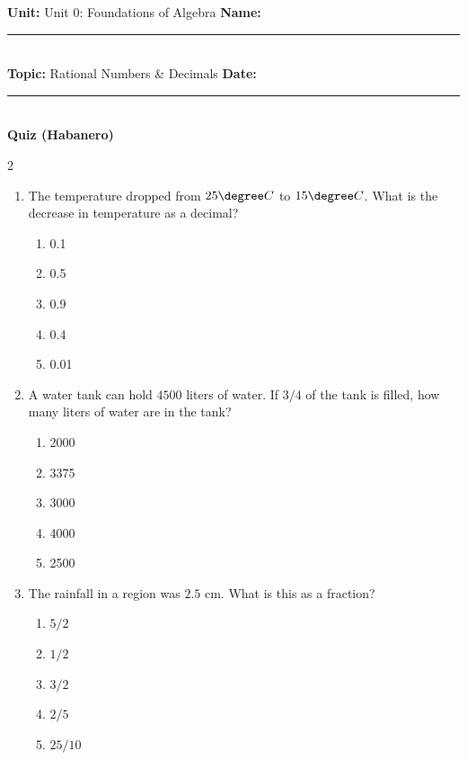 \documentclass[10pt]{article}
\begin{document}
\enlargethispage{2.5cm}

\begin{tcolorbox}[colback=mainblue!5, colframe=mainblue, sharp corners, boxrule=0.5pt]
    \small \textbf{Unit:} Unit 0: Foundations of Algebra \hfill \textbf{Name:} \rule{3cm}{0.4pt} \\
    \small \textbf{Topic:} Rational Numbers & Decimals \hfill \textbf{Date:} \rule{2cm}{0.4pt} \\
    \centering \textbf{\large Quiz (Habanero)}
\end{tcolorbox}

\vspace{0.2cm}

\begin{multicols}{2}
\begin{enumerate}[label=\textbf{Q\arabic*.}, leftmargin=*, itemsep=6pt, parsep=0pt]

  \item \small The temperature dropped from $25\degree C$ to $15\degree C$. What is the decrease in temperature as a decimal?
  \begin{enumerate}[label=(\Alph*), leftmargin=0.6cm, nosep, itemsep=2pt]
    \item 0.1
    \item 0.5
    \item 0.9
    \item 0.4
    \item 0.01
  \end{enumerate}

  \item \small A water tank can hold $4500$ liters of water. If $3/4$ of the tank is filled, how many liters of water are in the tank?
  \begin{enumerate}[label=(\Alph*), leftmargin=0.6cm, nosep, itemsep=2pt]
    \item 2000
    \item 3375
    \item 3000
    \item 4000
    \item 2500
  \end{enumerate}

  \item \small The rainfall in a region was $2.5$ cm. What is this as a fraction?
  \begin{enumerate}[label=(\Alph*), leftmargin=0.6cm, nosep, itemsep=2pt]
    \item $5/2$
    \item $1/2$
    \item $3/2$
    \item $2/5$
    \item $25/10$
  \end{enumerate}


\end{enumerate}
\end{multicols}
\end{document}

